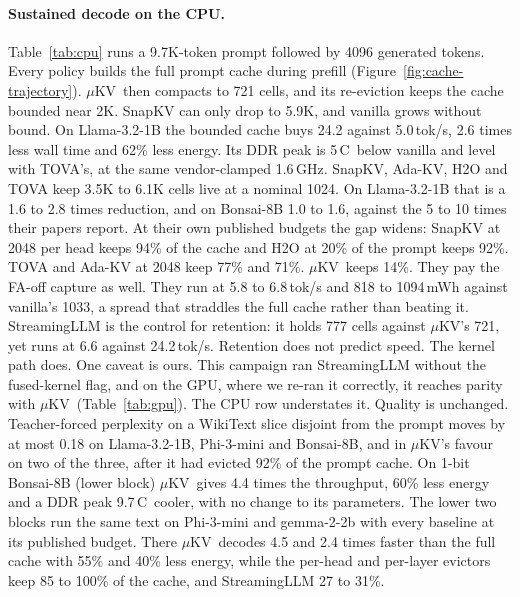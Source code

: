 \documentclass[sigconf, anonymous=false, screen=true, 10pt]{acmart}
\newcommand{\muKV}{$\mu$KV}
\newcommand{\C}{\,\textdegree C}
\begin{document}
\paragraph{Sustained decode on the CPU.} Table~\ref{tab:cpu} runs a 9.7K-token prompt followed by 4096 generated tokens. Every policy builds the full prompt cache during prefill (Figure~\ref{fig:cache-trajectory}). \muKV\ then compacts to 721 cells, and its re-eviction keeps the cache bounded near 2K. SnapKV can only drop to 5.9K, and vanilla grows without bound. On Llama-3.2-1B the bounded cache buys 24.2 against 5.0\,tok/s, 2.6 times less wall time and 62\% less energy. Its DDR peak is 5\C\ below vanilla and level with TOVA's, at the same vendor-clamped 1.6\,GHz. SnapKV, Ada-KV, H2O and TOVA keep 3.5K to 6.1K cells live at a nominal 1024. On Llama-3.2-1B that is a 1.6 to 2.8 times reduction, and on Bonsai-8B 1.0 to 1.6, against the 5 to 10 times their papers report. At their own published budgets the gap widens: SnapKV at 2048 per head keeps 94\% of the cache and H2O at 20\% of the prompt keeps 92\%. TOVA and Ada-KV at 2048 keep 77\% and 71\%. \muKV\ keeps 14\%. They pay the FA-off capture as well. They run at 5.8 to 6.8\,tok/s and 818 to 1094\,mWh against vanilla's 1033, a spread that straddles the full cache rather than beating it. StreamingLLM is the control for retention: it holds 777 cells against \muKV's 721, yet runs at 6.6 against 24.2\,tok/s. Retention does not predict speed. The kernel path does. One caveat is ours. This campaign ran StreamingLLM without the fused-kernel flag, and on the GPU, where we re-ran it correctly, it reaches parity with \muKV\ (Table~\ref{tab:gpu}). The CPU row understates it. Quality is unchanged. Teacher-forced perplexity on a WikiText slice disjoint from the prompt moves by at most 0.18 on Llama-3.2-1B, Phi-3-mini and Bonsai-8B, and in \muKV's favour on two of the three, after it had evicted 92\% of the prompt cache. On 1-bit Bonsai-8B (lower block) \muKV\ gives 4.4 times the throughput, 60\% less energy and a DDR peak 9.7\C\ cooler, with no change to its parameters. The lower two blocks run the same text on Phi-3-mini and gemma-2-2b with every baseline at its published budget. There \muKV\ decodes 4.5 and 2.4 times faster than the full cache with 55\% and 40\% less energy, while the per-head and per-layer evictors keep 85 to 100\% of the cache, and StreamingLLM 27 to 31\%.
\end{document}
